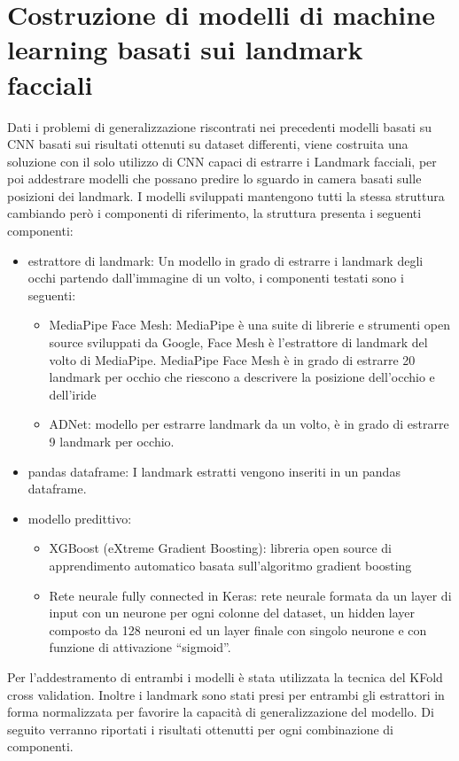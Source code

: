 \documentclass[12pt,a4paper,openright,twoside]{book}
\begin{document}
\section{Costruzione di modelli di machine learning basati sui landmark facciali}
Dati i problemi di generalizzazione riscontrati nei precedenti modelli basati su CNN basati sui risultati ottenuti su dataset differenti, viene costruita una soluzione con il solo utilizzo di CNN capaci di estrarre i Landmark facciali, per poi addestrare modelli che possano predire lo sguardo in camera basati sulle posizioni dei landmark.
I modelli sviluppati mantengono tutti la stessa struttura cambiando però i componenti di riferimento, la struttura presenta i seguenti componenti: \begin{itemize}
    \item estrattore di landmark: Un modello in grado di estrarre i landmark degli occhi partendo dall'immagine di un volto, i componenti testati sono i seguenti: \begin{itemize}
        \item MediaPipe Face Mesh: MediaPipe è una suite di librerie e strumenti open source sviluppati da Google, Face Mesh è l'estrattore di landmark del volto di MediaPipe. MediaPipe Face Mesh è in grado di estrarre 20 landmark per occhio che riescono a descrivere la posizione dell'occhio e dell'iride
        \item ADNet: modello per estrarre landmark da un volto, è in grado di estrarre 9 landmark per occhio.
    \end{itemize}
    \item pandas dataframe: I landmark estratti vengono inseriti in un pandas dataframe.
    \item modello predittivo: \begin{itemize}
        \item XGBoost (eXtreme Gradient Boosting): libreria open source di apprendimento automatico basata sull'algoritmo gradient boosting
        \item Rete neurale fully connected in Keras: rete neurale formata da un layer di input con un neurone per ogni colonne del dataset, un hidden layer composto da 128 neuroni ed un layer finale con singolo neurone e con funzione di attivazione ``sigmoid''.
    \end{itemize}
\end{itemize}
Per l'addestramento di entrambi i modelli è stata utilizzata la tecnica del KFold cross validation. Inoltre i landmark sono stati presi per entrambi gli estrattori in forma normalizzata per favorire la capacità di generalizzazione del modello. Di seguito verranno riportati i risultati ottenutti per ogni combinazione di componenti.
\end{document}
